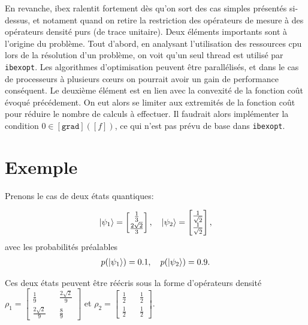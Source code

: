 
En revanche, ibex ralentit fortement dès qu'on sort des cas simples présentés si-dessus, et notament quand on retire la restriction des opérateurs de mesure à des opérateurs densité purs (de trace unitaire). Deux éléments importants sont à l'origine du problème. Tout d'abord, en analysant l'utilisation des ressources cpu lors de la résolution d'un problème, on voit qu'un seul thread est utilisé par \texttt{ibexopt}. Les algorithmes d'optimisation peuvent être parallélisés, et dans le cas de processeurs à plusieurs c\oe urs on pourrait avoir un gain de performance conséquent. Le deuxième élément est en lien avec la convexité de la fonction coût évoqué précédement. On eut alors se limiter aux extremités de la fonction coût pour réduire le nombre de calculs à effectuer. Il faudrait alors implémenter la condition $0 \in [\texttt{grad}]([f])$, ce qui n'est pas prévu de base dans \texttt{ibexopt}.


\section{Exemple}

Prenons le cas de deux états quantiques:

\begin{align}
    \ket{\psi_1} = \begin{bmatrix}\frac{1}{3} \\ \frac{2 \sqrt{2}}{3}\end{bmatrix} , \quad \ket{\psi_2} = \begin{bmatrix}\frac{1}{\sqrt{2}} \\ \frac{1}{\sqrt{2}}\end{bmatrix},
\end{align}
avec les probabilités préalables 
\begin{align}
    p(\ket{\psi_1}) = 0.1, \quad p(\ket{\psi_2}) = 0.9.
\end{align}

Ces deux états peuvent être réécris sous la forme d'opérateurs densité $\rho_1 = \begin{bmatrix}\frac{1}{9} && \frac{2 \sqrt{2}}{9} \\ \frac{2 \sqrt{2}}{9} && \frac{8}{9} \end{bmatrix}$ et $\rho_2 = \begin{bmatrix}\frac{1}{2} && \frac{1}{2} \\ \frac{1}{2} && \frac{1}{2} \end{bmatrix}$.

